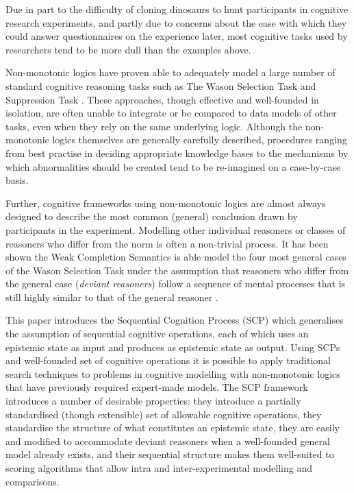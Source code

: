 \documentclass{article}
\begin{document}
Due in part to the difficulty of cloning dinosaurs to hunt participants in cognitive research experiments, and partly due to concerns about the ease with which they could answer questionnaires on the experience later, most cognitive tasks used by researchers tend to be more dull than the examples above.

Non-monotonic logics have proven able to adequately model a large number of standard cognitive reasoning tasks such as The Wason Selection Task\citep{wason1968reasoning} and Suppression Task \citep{byrne1989suppressing}. These approaches, though effective and well-founded in isolation, are often unable to integrate or be compared to data models of other tasks, even when they rely on the same underlying logic. Although the non-monotonic logics themselves are generally carefully described, procedures ranging from best practise in deciding appropriate knowledge bases to the mechanisms by which abnormalities should be created tend to be re-imagined on a case-by-case basis.

Further, cognitive frameworks using non-monotonic logics are almost always designed to describe the most common (general) conclusion drawn by participants in the experiment. Modelling other individual reasoners or classes of reasoners who differ from the norm is often a non-trivial process. It has been shown the Weak Completion Semantics is able model the four most general cases of the Wason Selection Task under the assumption that reasoners who differ from the general case (\textit{deviant reasoners}) follow a sequence of mental processes that is still highly similar to that of the general reasoner \citep{breu2019weak}.

This paper introduces the Sequential Cognition Process (SCP) which generalises the assumption of sequential cognitive operations, each of which uses an epistemic state as input and produces as epistemic state as output. Using SCPs and well-founded set of cognitive operations it is possible to apply traditional search techniques to problems in cognitive modelling with non-monotonic logics that have previously required expert-made models. The SCP framework introduces a number of desirable properties: they introduce a partially standardised (though extensible) set of allowable cognitive operations, they standardise the structure of what constitutes an epistemic state, they are easily and modified to accommodate deviant reasoners when a well-founded general model already exists, and their sequential structure makes them well-suited to scoring algorithms that allow intra and inter-experimental modelling and comparisons.
\end{document}
